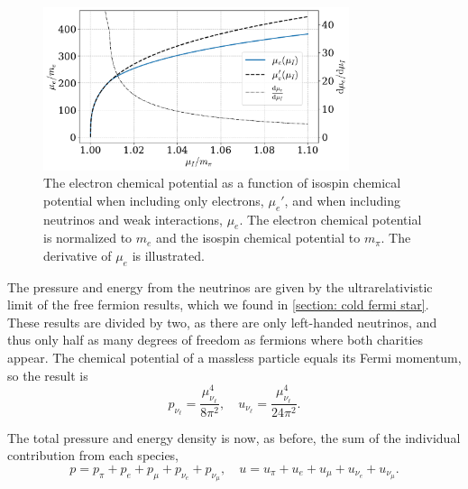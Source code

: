 \begin{figure}[!htb]
    \centering
    \includegraphics[width=0.8\textwidth]{../scripts/figurer/neutrino_mu.pdf}
    \caption{
        The electron chemical potential as a function of isospin chemical potential when including only electrons, $\mu_e'$, and when including neutrinos and weak interactions, $\mu_e$.
        The electron chemical potential is normalized to $m_e$ and the isospin chemical potential to $m_\pi$.
        The derivative of $\mu_e$ is illustrated.
    }
    \label{fig: neutrino mu}
\end{figure}


The pressure and energy from the neutrinos are given by the ultrarelativistic limit of the free fermion results, which we found in \autoref{section: cold fermi star}.
These results are divided by two, as there are only left-handed neutrinos, and thus only half as many degrees of freedom as fermions where both charities appear.
The chemical potential of a massless particle equals its Fermi momentum, so the result is
%
\begin{equation}
    p_{\nu_\ell} = \frac{\mu_{\nu_\ell}^4}{8 \pi^2}, \quad 
    u_{\nu_\ell} = \frac{\mu_{\nu_\ell}^4}{24 \pi^2}.
\end{equation}
%

The total pressure and energy density is now, as before, the sum of the individual contribution from each species,
%
\begin{equation}
    p = p_\pi + p_e + p_\mu + p_{\nu_e} + p_{\nu_\mu}, \quad
    u = u_\pi + u_e + u_\mu + u_{\nu_e} + u_{\nu_\mu}.
\end{equation}
%

